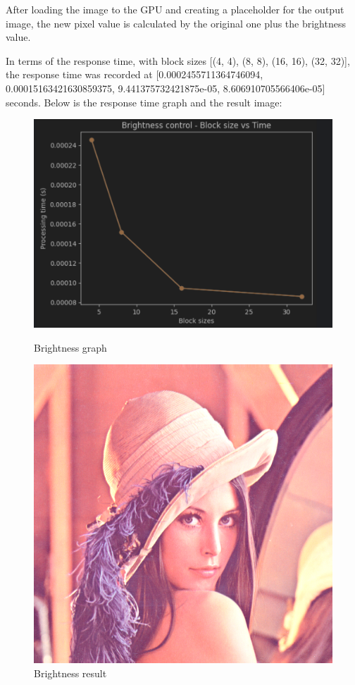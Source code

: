 \documentclass{article}
\begin{document}
After loading the image to the GPU and creating a placeholder for the output image, the new pixel value is calculated by the original one plus the brightness value.

In terms of the response time, with block sizes [(4, 4), (8, 8), (16, 16), (32, 32)], the response time was recorded at [0.0002455711364746094, 0.00015163421630859375, 9.441375732421875e-05, 8.606910705566406e-05] seconds. Below is the response time graph and the result image:

\begin{figure}[H]
    \begin{minipage}{0.48\textwidth}
        \centering
        \includegraphics[width=.7\linewidth]{Brightness control - Block size vs Time.png}
        \caption{Brightness graph}
        \label{fig:Brightness graph}
    \end{minipage}\hfill
    \begin{minipage}{0.48\textwidth}
        \centering
        \includegraphics[width=.7\linewidth]{brightness_control.png}
        \caption{Brightness result}
        \label{fig:Brightness result}
    \end{minipage}\hfill
\end{figure}
\end{document}
